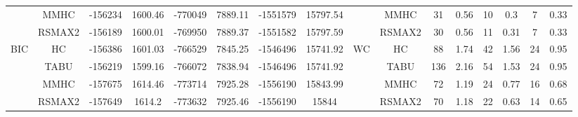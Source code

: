 \begin{table}[p]
{\begin{tabular}{cc||cc|cc|cc||cc|cc|cc|cc}
& MMHC &	-156234 & 	1600.46 & 	-770049 & 	7889.11 & 	-1551579 & 	15797.54 & 	& MMHC &	31 & 	0.56 & 	10 & 	0.3 & 	7 & 	0.33\tabularnewline													
& RSMAX2 &	-156189 & 	1600.01 & 	-769950 & 	7889.37 & 	-1551582 & 	15797.59 & 	& RSMAX2 &	30 & 	0.56 & 	11 & 	0.31 & 	7 & 	0.33\tabularnewline													
\hline																										
\multirow{4}{*}{BIC} & HC &	-156386 & 	1601.03 & 	-766529 & 	7845.25 & 	-1546496 & 	15741.92 & 	\multirow{4}{*}{WC} & HC &	88 & 	1.74 & 	42 & 	1.56 & 	24 & 	0.95\tabularnewline													
& TABU &	-156219 & 	1599.16 & 	-766072 & 	7838.94 & 	-1546496 & 	15741.92 & 	& TABU &	136 & 	2.16 & 	54 & 	1.53 & 	24 & 	0.95\tabularnewline													
& MMHC &	-157675 & 	1614.46 & 	-773714 & 	7925.28 & 	-1556190 & 	15843.99 & 	& MMHC &	72 & 	1.19 & 	24 & 	0.77 & 	16 & 	0.68\tabularnewline													
& RSMAX2 &	-157649 & 	1614.2 & 	-773632 & 	7925.46 & 	-1556190 & 	15844 & 	& RSMAX2 &	70 & 	1.18 & 	22 & 	0.63 & 	14 & 	0.65\tabularnewline													
\hline																										
\end{tabular}																										
}																										
\end{table}																										


